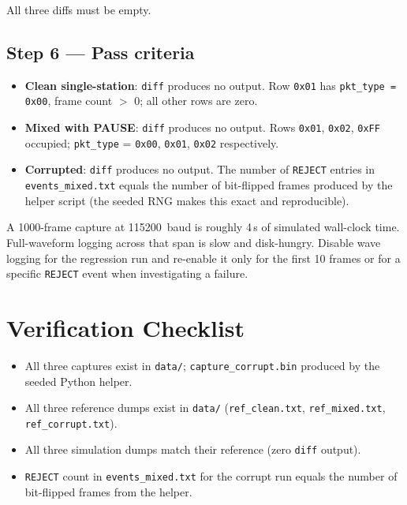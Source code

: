 \documentclass[11pt,letterpaper]{article}
\begin{document}
All three diffs must be empty.

\subsection{Step 6 --- Pass criteria}
\begin{itemize}[leftmargin=2em]
	\item \textbf{Clean single-station}: \texttt{diff} produces no output. Row \texttt{0x01} has \texttt{pkt\_type = 0x00}, frame count $>$ 0; all other rows are zero.
	\item \textbf{Mixed with PAUSE}: \texttt{diff} produces no output. Rows \texttt{0x01}, \texttt{0x02}, \texttt{0xFF} occupied; \texttt{pkt\_type} = \texttt{0x00}, \texttt{0x01}, \texttt{0x02} respectively.
	\item \textbf{Corrupted}: \texttt{diff} produces no output. The number of \texttt{REJECT} entries in \texttt{events\_mixed.txt} equals the number of bit-flipped frames produced by the helper script (the seeded RNG makes this exact and reproducible).
\end{itemize}


\begin{tcolorbox}[warning={Simulation runtime trap}]
	A 1000-frame capture at 115200~baud is roughly 4\,s of simulated wall-clock time. Full-waveform logging across that span is slow and disk-hungry. Disable wave logging for the regression run and re-enable it only for the first 10 frames or for a specific \texttt{REJECT} event when investigating a failure.
\end{tcolorbox}

\section{Verification Checklist}
\begin{itemize}[leftmargin=2em]
	\item[$\square$] All three captures exist in \texttt{data/}; \texttt{capture\_corrupt.bin} produced by the seeded Python helper.
	\item[$\square$] All three reference dumps exist in \texttt{data/} (\texttt{ref\_clean.txt}, \texttt{ref\_mixed.txt}, \texttt{ref\_corrupt.txt}).
	\item[$\square$] All three simulation dumps match their reference (zero \texttt{diff} output).
	\item[$\square$] \texttt{REJECT} count in \texttt{events\_mixed.txt} for the corrupt run equals the number of bit-flipped frames from the helper.
\end{itemize}
\end{document}
